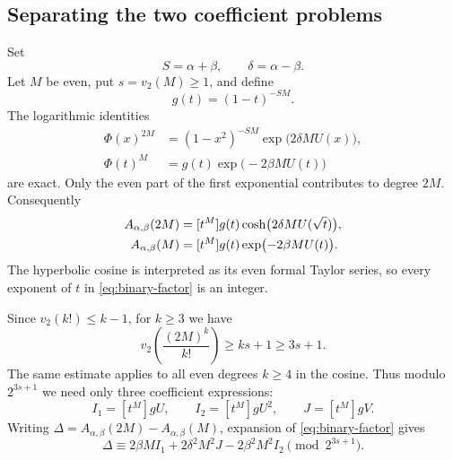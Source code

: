 \documentclass[11pt,a4paper]{article}
\numberwithin{equation}{section}
\theoremstyle{definition}
\theoremstyle{remark}
\newcommand{\A}{A_{\alpha,\beta}}
\begin{document}
\subsection{Separating the two coefficient problems}
Set
\[
 S=\alpha+\beta,\qquad \delta=\alpha-\beta.
\]
Let $M$ be even, put $s=v_2(M)\ge1$, and define
\[
 g(t)=(1-t)^{-SM}.
\]
The logarithmic identities
\begin{align*}
 \Phi(x)^{2M}&=(1-x^2)^{-SM}\exp\bigl(2\delta M U(x)\bigr),\\
 \Phi(t)^M&=g(t)\exp\bigl(-2\beta M U(t)\bigr)
\end{align*}
are exact. Only the even part of the first exponential contributes to degree
$2M$. Consequently
\begin{align}\label{eq:binary-factor}
 \A(2M)&=[t^M]g(t)\cosh\bigl(2\delta M U(\sqrt t)\bigr),\notag\\
 \A(M)&=[t^M]g(t)\exp\bigl(-2\beta M U(t)\bigr).
\end{align}
The hyperbolic cosine is interpreted as its even formal Taylor series,
so every exponent of $t$ in \eqref{eq:binary-factor} is an integer.

Since $v_2(k!)\le k-1$, for $k\ge3$ we have
\[
 v_2\left(\frac{(2M)^k}{k!}\right)\ge ks+1\ge3s+1.
\]
The same estimate applies to all even degrees $k\ge4$ in the cosine.
Thus modulo $2^{3s+1}$ we need only three coefficient expressions:
\begin{equation}\label{eq:I-def}
 I_1=[t^M]gU,\qquad I_2=[t^M]gU^2,\qquad J=[t^M]gV.
\end{equation}
Writing $\Delta=\A(2M)-\A(M)$, expansion of
\eqref{eq:binary-factor} gives
\begin{equation}\label{eq:delta-start}
 \Delta\equiv
 2\beta M I_1+2\delta^2M^2J-2\beta^2M^2I_2
 \pmod{2^{3s+1}}.
\end{equation}
\end{document}
